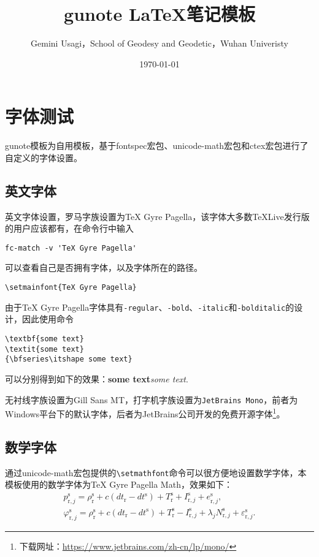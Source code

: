 \documentclass{gunote}
\title{gunote \LaTeX{}笔记模板}
\author{Gemini Usagi，School of Geodesy and Geodetic，Wuhan Univeristy}
\date{\today}
\newcommand{\cmd}[1]{\texttt{\backslash #1}}
\begin{document}
\maketitle
\tableofcontents

\section{字体测试}
\textsf{gunote}模板为自用模板，基于\textsf{fontspec}宏包、\textsf{unicode-math}宏包和\textsf{ctex}宏包进行了自定义的字体设置。
\subsection{英文字体}
英文字体设置，罗马字族设置为TeX Gyre Pagella，该字体大多数\TeX{}Live发行版的用户应该都有，在命令行中输入
\begin{verbatim}
fc-match -v 'TeX Gyre Pagella'
\end{verbatim}
可以查看自己是否拥有字体，以及字体所在的路径。
\begin{verbatim}
\setmainfont{TeX Gyre Pagella}
\end{verbatim}
由于TeX Gyre Pagella字体具有\texttt{-regular}、\texttt{-bold}、\texttt{-italic}和\texttt{-bolditalic}的设计，因此使用命令
\begin{verbatim}
\textbf{some text}
\textit{some text}
{\bfseries\itshape some text}
\end{verbatim}
可以分别得到如下的效果：\textbf{some text}\quad\textit{some text}.

无衬线字族设置为\textsf{Gill Sans MT}，打字机字族设置为\texttt{JetBrains Mono}，前者为Windows平台下的默认字体，后者为JetBrains公司开发的免费开源字体\footnote{下载网址：\url{https://www.jetbrains.com/zh-cn/lp/mono/}}。
\subsection{数学字体}
通过\textsf{unicode-math}宏包提供的\cmd{setmathfont}命令可以很方便地设置数学字体，本模板使用的数学字体为TeX Gyre Pagella Math，效果如下：
{
\def\rcv{\mathrm{r}}
\def\sat{\mathrm{s}}
\begin{gather}
  p_{\rcv,j}^\sat=\rho_\rcv^\sat+c(dt_\rcv-dt^\sat)+T_\rcv^\sat+I_{\rcv,j}^\sat+e_{\rcv,j}^\sat,\\
  \varphi_{\rcv,j}^\sat=\rho_\rcv^\sat+c(dt_\rcv-dt^\sat)+T_\rcv^\sat-I_{\rcv,j}^\sat+\lambda_j N_{\rcv,j}^\sat+\varepsilon_{\rcv,j}^\sat.
\end{gather}
}
\end{document}
